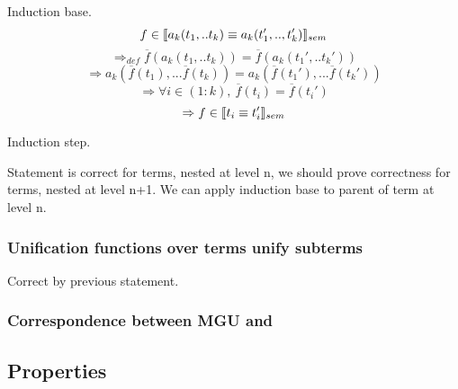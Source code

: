 \documentclass[fleqn]{article}
\begin{document}
Induction base.
\[ f \in \llbracket a_k(t_1, .. t_k) \equiv a_k(t_1',.., t_k') \rrbracket_{sem} \]
\[ \Rightarrow_{def} \overline{f}(a_k(t_1, .. t_k)) = \overline{f}(a_k(t_1', .. t_k'))\]
\[ \Rightarrow a_k(\overline{f}(t_1), ... \overline{f}(t_k)) = a_k(\overline{f}(t_1'), ... \overline{f}(t_k')) \]
\[ \Rightarrow \forall i \in (1:k),\  \overline{f}(t_i) = \overline{f}(t_i') \]
\[ \Rightarrow f \in \llbracket t_i \equiv t_i' \rrbracket_{sem} \]

Induction step.

Statement is correct for terms, nested at level n, we should prove correctness for terms, nested at level n+1. We can apply induction base to parent of term at level n.

\subsubsection{ Unification functions over terms unify subterms }

Correct by previous statement.

\subsubsection{Correspondence between MGU and }

\subsection{ Properties  }
\end{document}
